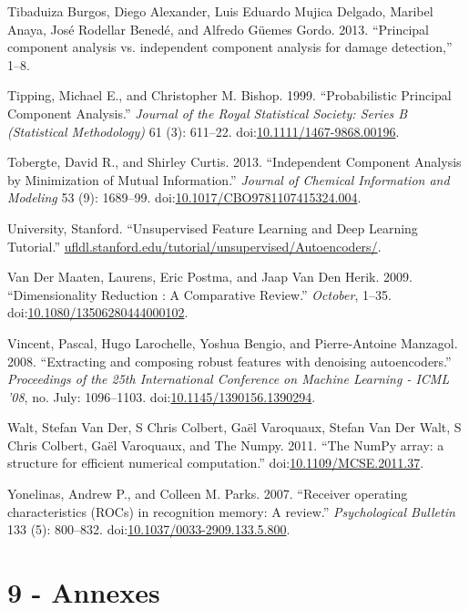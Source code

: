 \documentclass[]{article}
\begin{document}
{Tibaduiza Burgos}, Diego Alexander, Luis Eduardo {Mujica Delgado},
Maribel Anaya, Jos{é} {Rodellar Bened{é}}, and Alfredo {G{ü}emes Gordo}.
2013. ``Principal component analysis vs. independent component analysis
for damage detection,'' 1--8.

Tipping, Michael E., and Christopher M. Bishop. 1999. ``Probabilistic
Principal Component Analysis.'' \emph{Journal of the Royal Statistical
Society: Series B (Statistical Methodology)} 61 (3): 611--22.
doi:\href{http://dx.doi.org/10.1111/1467-9868.00196}{10.1111/1467-9868.00196}.

Tobergte, David R., and Shirley Curtis. 2013. ``Independent Component
Analysis by Minimization of Mutual Information.'' \emph{Journal of
Chemical Information and Modeling} 53 (9): 1689--99.
doi:\href{http://dx.doi.org/10.1017/CBO9781107415324.004}{10.1017/CBO9781107415324.004}.

University, Stanford. ``Unsupervised Feature Learning and Deep Learning
Tutorial.''
\url{ufldl.stanford.edu/tutorial/unsupervised/Autoencoders/}.

{Van Der Maaten}, Laurens, Eric Postma, and Jaap {Van Den Herik}. 2009.
``Dimensionality Reduction : A Comparative Review.'' \emph{October},
1--35.
doi:\href{http://dx.doi.org/10.1080/13506280444000102}{10.1080/13506280444000102}.

Vincent, Pascal, Hugo Larochelle, Yoshua Bengio, and Pierre-Antoine
Manzagol. 2008. ``Extracting and composing robust features with
denoising autoencoders.'' \emph{Proceedings of the 25th International
Conference on Machine Learning - ICML '08}, no. July: 1096--1103.
doi:\href{http://dx.doi.org/10.1145/1390156.1390294}{10.1145/1390156.1390294}.

Walt, Stefan Van Der, S Chris Colbert, Ga{ë}l Varoquaux, Stefan Van Der
Walt, S Chris Colbert, Ga{ë}l Varoquaux, and The Numpy. 2011. ``The
NumPy array: a structure for efficient numerical computation.''
doi:\href{http://dx.doi.org/10.1109/MCSE.2011.37}{10.1109/MCSE.2011.37}.

Yonelinas, Andrew P., and Colleen M. Parks. 2007. ``Receiver operating
characteristics (ROCs) in recognition memory: A review.''
\emph{Psychological Bulletin} 133 (5): 800--832.
doi:\href{http://dx.doi.org/10.1037/0033-2909.133.5.800}{10.1037/0033-2909.133.5.800}.

\section*{9 - Annexes}\label{annexes}
\end{document}
